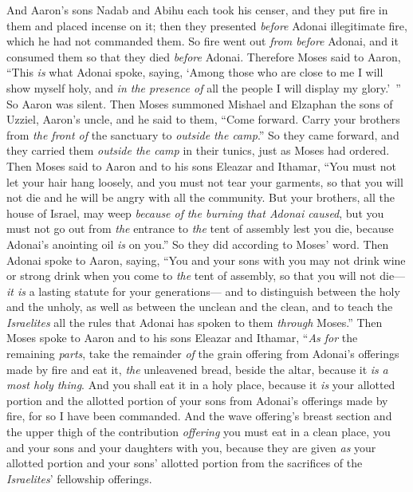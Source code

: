 \begin{biblechapter} %
 And Aaron’s sons Nadab and Abihu each took his censer, and they put fire in them and placed incense on it; then they presented \textit{before} Adonai illegitimate fire, which he had not commanded them.
\verse So fire went out \textit{from before} Adonai, and it consumed them so that they died \textit{before} Adonai.
\verse Therefore Moses said to Aaron, “This \textit{is} what Adonai spoke, saying, ‘Among those who are close to me I will show myself holy, and \textit{in the presence of} all the people I will display my glory.’ ” So Aaron was silent.
\verse Then Moses summoned Mishael and Elzaphan the sons of Uzziel, Aaron’s uncle, and he said to them, “Come forward. Carry your brothers from \textit{the front of} the sanctuary to \textit{outside the camp}.”
\verse So they came forward, and they carried them \textit{outside the camp} in their tunics, just as Moses had ordered.
\verse Then Moses said to Aaron and to his sons Eleazar and Ithamar, “You must not let your hair hang loosely, and you must not tear your garments, so that you will not die and he will be angry with all the community. But your brothers, all the house of Israel, may weep \textit{because of} \textit{the burning that Adonai caused},
\verse but you must not go out from \textit{the} entrance to \textit{the} tent of assembly lest you die, because Adonai’s anointing oil \textit{is} on you.” So they did according to Moses’ word.
 Then Adonai spoke to Aaron, saying,
\verse “You and your sons with you may not drink wine or strong drink when you come to \textit{the} tent of assembly, so that you will not die—\textit{it is} a lasting statute for your generations—
\verse and to distinguish between the holy and the unholy, as well as between the unclean and the clean,
\verse and to teach the \textit{Israelites} all the rules that Adonai has spoken to them \textit{through} Moses.”
\verse Then Moses spoke to Aaron and to his sons Eleazar and Ithamar, “\textit{As for} the remaining \textit{parts}, take the remainder \textit{of} the grain offering from Adonai’s offerings made by fire and eat it, \textit{the} unleavened bread, beside the altar, because it \textit{is} \textit{a most holy thing}.
\verse And you shall eat it in a holy place, because it \textit{is} your allotted portion and the allotted portion of your sons from Adonai’s offerings made by fire, for so I have been commanded.
\verse And the wave offering’s breast section and the upper thigh of the contribution \textit{offering} you must eat in a clean place, you and your sons and your daughters with you, because they are given \textit{as} your allotted portion and your sons’ allotted portion from the sacrifices of the \textit{Israelites}’ fellowship offerings.

\end{biblechapter}
